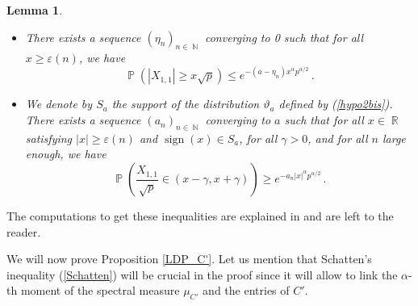 \documentclass[11pt,a4paper]{article}
\DeclareMathOperator{\N}{\mathbb{N}}
\DeclareMathOperator{\R}{\mathbb{R}}
\DeclareMathOperator{\PR}{\mathbb{P}}
\DeclareMathOperator{\1}{\mathbf{1}}
\DeclareMathOperator{\sgn}{\mathrm{sign}}
\newtheorem{Lemma}[Proposition]{Lemma}
\theoremstyle{definition}
\begin{document}
\begin{Lemma}
\begin{itemize}
\item[(i)] There exists a sequence $(\eta_n)_{n \in \N}$ converging to 0 such that for all $x \ge \varepsilon(n)$, we have
\begin{equation} \label{LDP_C'_lemma2}
\PR(|X_{1,1}| \ge x\sqrt{p}) \le e^{-(a-\eta_n) x^{\alpha} p^{\alpha/2}} \, .
\end{equation}
\item[(ii)] We denote by $S_a$ the support of the distribution $\vartheta_a$ defined by (\ref{hypo2bis}). There exists a sequence $(a_n)_{n \in \N}$ converging to $a$ such that for all $x \in \R$ satisfying $|x| \ge \varepsilon(n)$ and $\sgn(x) \in S_a$, for all $\gamma>0$, and for all $n$ large enough, we have
\begin{equation} \label{LDP_C'_lemma3}
\PR \left( \frac{X_{1,1}}{\sqrt{p}} \in (x-\gamma,x+\gamma) \right) \ge e^{-a_n |x|^{\alpha} p^{\alpha/2}} \, .
\end{equation}
\end{itemize}
\end{Lemma}

The computations to get these inequalities are explained in \cite[p. 26]{BC} and are left to the reader.

We will now prove Proposition \ref{LDP_C'}. Let us mention that Schatten's inequality (\ref{Schatten}) will be crucial in the proof since it will allow to link the $\alpha$-th moment of the spectral measure $\mu_{C'}$ and the entries of $C'$.
\end{document}
